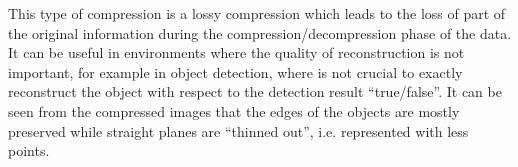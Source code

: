 This type of compression is a lossy compression which leads to the loss of part of the original information during the compression/decompression phase of the data. It can be useful in environments where the quality of reconstruction is not important, for example in object detection, where is not crucial to exactly reconstruct the object with respect to the detection result ``true/false''. It can be seen from the compressed images that the edges of the objects are mostly preserved while straight planes are ``thinned out'', i.e. represented with less points.